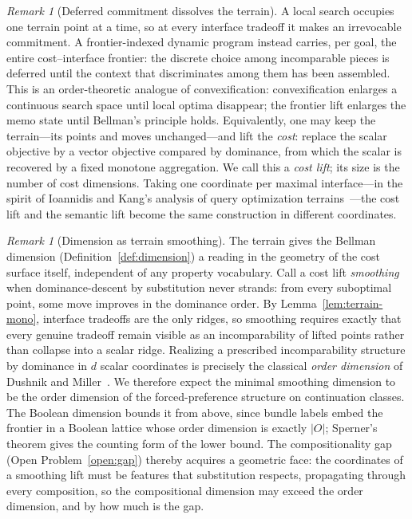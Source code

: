 \documentclass[sigconf,nonacm]{acmart}
\theoremstyle{definition}
\theoremstyle{plain}
\theoremstyle{remark}
\newtheorem{remark}[definition]{Remark}
\begin{document}
\begin{remark}[Deferred commitment dissolves the terrain]
A local search occupies one terrain point at a time, so at every
interface tradeoff it makes an irrevocable commitment.  A
frontier-indexed dynamic program instead carries, per goal, the
entire cost--interface frontier: the discrete choice among
incomparable pieces is deferred until the context that discriminates
among them has been assembled.  This is an order-theoretic analogue
of convexification: convexification enlarges a continuous search
space until local optima disappear; the frontier lift enlarges the
memo state until Bellman's principle holds.  Equivalently, one may
keep the terrain---its points and moves unchanged---and lift the
\emph{cost}: replace the scalar objective by a vector objective
compared by dominance, from which the scalar is recovered by a fixed
monotone aggregation.  We call this a \emph{cost lift}; its size is
the number of cost dimensions.  Taking one coordinate per maximal
interface---in the spirit of Ioannidis and Kang's analysis of query
optimization terrains~\cite{ioannidis1991left}---the cost lift and
the semantic lift become the same construction in different
coordinates.
\end{remark}

\begin{remark}[Dimension as terrain smoothing]
\label{rem:terrain-dim}
The terrain gives the Bellman dimension
(Definition~\ref{def:dimension}) a reading in the geometry of the
cost surface itself, independent of any property vocabulary.  Call a
cost lift \emph{smoothing} when dominance-descent by substitution
never strands: from every suboptimal point, some move improves in
the dominance order.  By Lemma~\ref{lem:terrain-mono}, interface
tradeoffs are the only ridges, so smoothing requires exactly that
every genuine tradeoff remain visible as an incomparability of
lifted points rather than collapse into a scalar ridge.  Realizing a
prescribed incomparability structure by dominance in $d$ scalar
coordinates is precisely the classical \emph{order dimension} of
Dushnik and Miller~\cite{dushnikmiller1941}.  We therefore expect
the minimal smoothing dimension to be the order dimension of the
forced-preference structure on continuation classes.  The Boolean
dimension bounds it from above, since bundle labels embed the
frontier in a Boolean lattice whose order dimension is exactly
$|O|$; Sperner's theorem gives the counting form of the lower bound.
The compositionality gap (Open Problem~\ref{open:gap}) thereby
acquires a geometric face: the coordinates of a smoothing lift must
be features that substitution respects, propagating through every
composition, so the compositional dimension may exceed the order
dimension, and by how much is the gap.
\end{remark}
\end{document}

